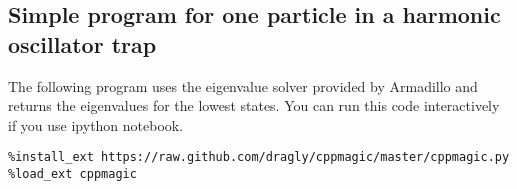 \documentclass[%
oneside,                 %
final,                   %
10pt]{article}
\begin{document}
\subsection*{Simple program for one particle in a harmonic oscillator trap}

The following program uses the eigenvalue solver provided by Armadillo and returns the eigenvalues for the lowest states. You can run this code interactively if you use ipython notebook.



\begin{verbatim}
%install_ext https://raw.github.com/dragly/cppmagic/master/cppmagic.py
%load_ext cppmagic

\end{verbatim}
\end{document}
